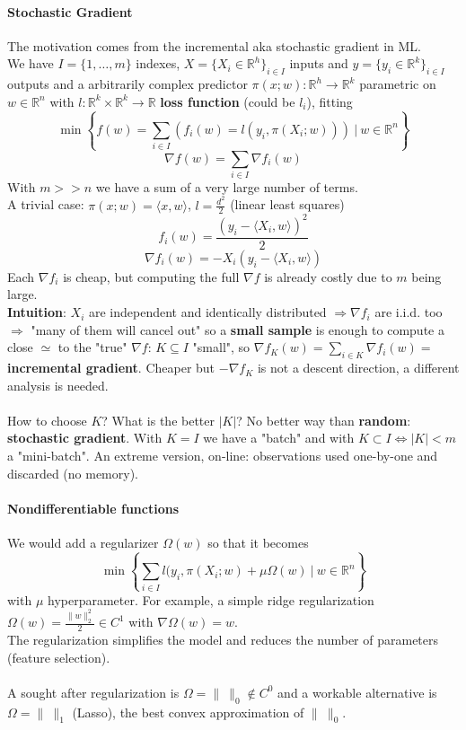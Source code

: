 \documentclass[10pt]{report}
\begin{document}
\paragraph{Stochastic Gradient} The motivation comes from the incremental aka stochastic gradient in ML.\\
We have $I=\{1,\ldots,m\}$ indexes, $X=\{X_i\in \mathbb{R}^h\}_{i\in I}$ inputs and $y=\{y_i\in \mathbb{R}^k\}_{i\in I}$ outputs and a arbitrarily complex predictor $\pi(x;w):\mathbb{R}^h\rightarrow \mathbb{R}^k$ parametric on $w\in \mathbb{R}^n$ with $l:\mathbb{R}^k\times \mathbb{R}^k \rightarrow \mathbb{R}$ \textbf{loss function} (could be $l_i$), fitting $$\min\left\{f(w) = \sum_{i\in I}\left(f_i(w) = l(y_i, \pi(X_i;w)) \right)\:|\:w\in \mathbb{R}^n\right\}$$
$$\nabla f(w) = \sum_{i\in I}\nabla f_i(w)$$
With $m >> n$ we have a sum of a very large number of terms.\\
A trivial case: $\pi(x;w) = \langle x,w\rangle$, $l=\frac{d^2}{2}$ (linear least squares)
$$f_i(w) = \frac{(y_i-\langle X_i, w\rangle)^2}{2}$$ $$\nabla f_i(w) = -X_i(y_i - \langle X_i, w\rangle)$$
Each $\nabla f_i$ is cheap, but computing the full $\nabla f$ is already costly due to $m$ being large.\\
\textbf{Intuition}: $X_i$ are independent and identically distributed $\Rightarrow\nabla f_i$ are i.i.d. too $\Rightarrow$ "many of them will cancel out" so a \textbf{small sample} is enough to compute a close $\simeq$ to the "true" $\nabla f$: $K\subseteq I$ "small", so $\nabla f_K(w) = \sum_{i\in K}\nabla f_i(w) =$ \textbf{incremental gradient}. Cheaper but $-\nabla f_K$ is not a descent direction, a different analysis is needed.\\\\
How to choose $K$? What is the better $|K|$? No better way than \textbf{random}: \textbf{stochastic gradient}. With $K = I$ we have a "batch" and with $K\subset I \Leftrightarrow |K| < m$ a "mini-batch". An extreme version, on-line: observations used one-by-one and discarded (no memory).
\paragraph{Nondifferentiable functions} We would add a regularizer $\Omega(w)$ so that it becomes $$\min\left\{\sum_{i\in I} l(y_i, \pi(X_i;w)+\mu\Omega(w)\:|\:w\in \mathbb{R}^n\right\}$$ with $\mu$ hyperparameter. For example, a simple ridge regularization $\Omega(w) = \frac{\displaystyle \|w\|_2^2}{\displaystyle 2}\in C^1$ with $\nabla\Omega(w) = w$.\\
The regularization simplifies the model and reduces the number of parameters (feature selection).\\\\
A sought after regularization is $\Omega = \|\:\|_0\not\in C^0$ and a workable alternative is $\Omega = \|\:\|_1$ (Lasso), the best convex approximation of $\|\:\|_0$.
\end{document}
